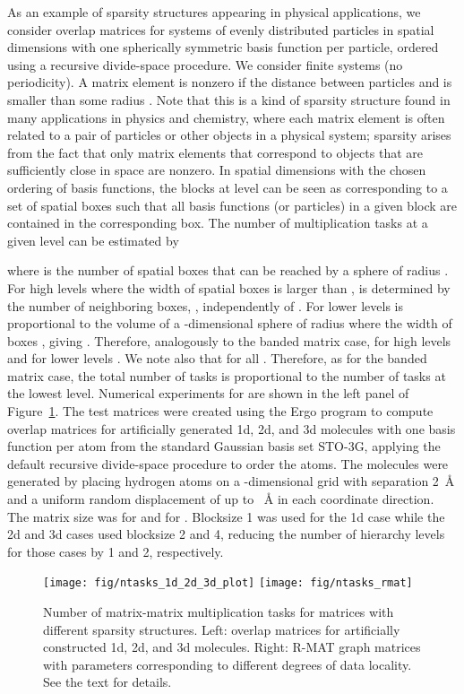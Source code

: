 \documentclass{elsarticle}
\begin{document}
As an example of sparsity structures appearing in physical
applications, we consider overlap matrices for systems of evenly
distributed particles in  spatial dimensions with one
spherically symmetric basis function per particle, ordered using a
recursive divide-space procedure. We consider finite systems (no
periodicity). A
matrix element  is nonzero if the distance between particles
  and  is smaller than some radius . Note that this
is a kind of sparsity structure found in many applications in physics
and chemistry, where each matrix element is often related to a pair of
particles or other objects in a physical system; sparsity arises from
the fact that only matrix elements that correspond to objects that are
sufficiently close in space are nonzero.
In  spatial dimensions with the chosen ordering of basis functions,
the  blocks at level  can be seen as corresponding to a set of
 spatial boxes such that all basis functions (or particles) in a
given block are contained in the corresponding box. The number of
multiplication tasks at a given level can be estimated by

where  is the number of spatial boxes that can be reached by a
sphere of radius . For high levels where the width of spatial boxes
is larger than ,  is determined by the number of neighboring
boxes, , independently of . For lower levels  is
proportional to the volume of a -dimensional sphere of radius
 where the width of boxes , giving . Therefore,
analogously to the banded matrix case, for high levels
 and for lower levels
.
We note also that  for all .
Therefore, as for the banded matrix
case, the total number of tasks is proportional to the number of tasks
at the lowest level.
Numerical experiments for  are shown in the left panel of
Figure~\ref{fig:ntasks_1d_2d_3d_and_rmat}.
The test matrices were created using the {\sc Ergo} program \cite{linmemDFT} to compute
overlap matrices for artificially generated 1d, 2d, and 3d molecules
with one basis function per atom from the standard Gaussian basis set STO-3G, applying the default
recursive divide-space procedure to order the atoms. The molecules
were generated by placing hydrogen atoms on a -dimensional grid with
separation 2~{\AA} and a uniform random displacement of up to ~{\AA} in each coordinate direction. The matrix size
was  for  and  for . Blocksize 1 was used for the 1d case while the 2d and 3d cases
used blocksize 2 and 4, reducing the number of hierarchy levels for those
cases by 1 and 2, respectively.


\begin{figure}
  \begin{center}
    \texttt{[image: fig/ntasks\_1d\_2d\_3d\_plot]}
    \texttt{[image: fig/ntasks\_rmat]}
  \end{center}
  \caption{Number of matrix-matrix multiplication tasks for matrices
    with different sparsity structures. Left: overlap matrices for
    artificially constructed 1d, 2d, and 3d molecules. Right: R-MAT
    graph matrices with parameters corresponding to different degrees
    of data locality. See the text for
    details. \label{fig:ntasks_1d_2d_3d_and_rmat}}
\end{figure}
\end{document}
